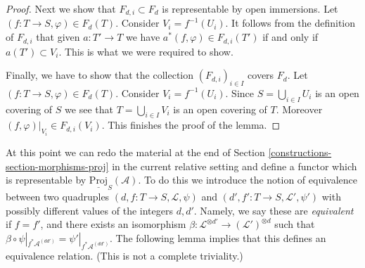 \begin{proof}
\medskip\noindent
Next we show that $F_{d, i} \subset F_d$ is representable by open immersions.
Let $(f : T \to S, \varphi) \in F_d(T)$. Consider $V_i = f^{-1}(U_i)$.
It follows from the definition of $F_{d, i}$ that given $a : T' \to T$
we have $a^*(f, \varphi) \in F_{d, i}(T')$ if and only if $a(T') \subset V_i$.
This is what we were required to show.

\medskip\noindent
Finally, we have to show that the collection $(F_{d, i})_{i \in I}$
covers $F_d$. Let $(f : T \to S, \varphi) \in F_d(T)$.
Consider $V_i = f^{-1}(U_i)$. Since $S = \bigcup_{i \in I} U_i$
is an open covering of $S$ we see that $T = \bigcup_{i \in I} V_i$
is an open covering of $T$. Moreover $(f, \varphi)|_{V_i} \in F_{d, i}(V_i)$.
This finishes the proof of the lemma.
\end{proof}

At this point we can redo the material at the end of
Section \ref{constructions-section-morphisms-proj} in the current
relative setting and define a functor
which is representable by
$\underline{\text{Proj}}_S(\mathcal{A})$. To do this we introduce the
notion of equivalence between two
quadruples $(d, f : T \to S, \mathcal{L}, \psi)$ and
$(d', f' : T \to S, \mathcal{L}', \psi')$ with possibly different
values of the integers $d, d'$. Namely, we say these
are {\it equivalent} if $f = f'$, and there exists an
isomorphism $\beta : \mathcal{L}^{\otimes d'} \to (\mathcal{L}')^{\otimes d}$
such that
$\beta \circ \psi|_{f^*\mathcal{A}^{(dd')}} = \psi'|_{f^*\mathcal{A}^{(dd')}}$.
The following lemma implies that this defines an equivalence relation.
(This is not a complete triviality.)

